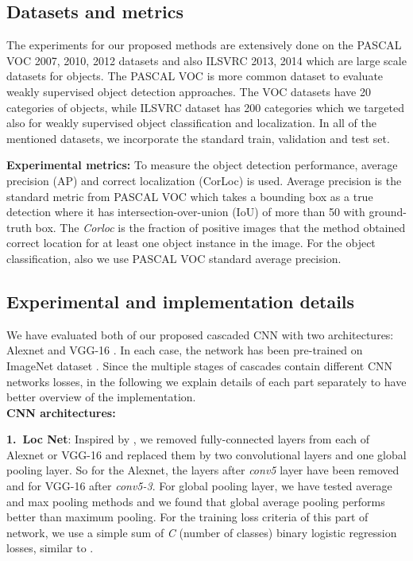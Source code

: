 \documentclass[10pt,twocolumn,letterpaper]{article}
\begin{document}
\subsection{Datasets and metrics}
The experiments for our proposed methods are extensively done on the PASCAL VOC 2007, 2010, 2012 datasets and also ILSVRC 2013, 2014 which are large scale datasets for objects. The PASCAL VOC is more common dataset to evaluate weakly supervised object detection approaches. The VOC datasets have 20 categories of objects, while ILSVRC dataset has 200 categories which we targeted also for weakly supervised object classification and localization. In all of the mentioned datasets, we incorporate the standard train, validation and test set.

\textbf{Experimental metrics:} To measure the object detection performance, average precision (AP) and correct localization (CorLoc) is used. Average precision is the standard metric from PASCAL VOC which takes a bounding box as a true detection where it has intersection-over-union (IoU) of more than 50 with ground-truth box. The \textit{Corloc} is the fraction of positive images that the method obtained correct location for at least one object instance in the image. For the object classification, also we use PASCAL VOC standard average precision.

\subsection{Experimental and implementation details }
We have evaluated both of our proposed cascaded CNN with two architectures: Alexnet \cite{alexnet} and VGG-16 \cite{vgg}. In each case, the network has been pre-trained on ImageNet dataset \cite{imagenet}. Since the multiple stages of cascades contain different CNN networks losses, in the following we explain details of each part separately to have better overview of the implementation.
\\
\textbf{CNN architectures:}

\textbf{1.~Loc Net}: Inspired by \cite{gap_paper}, we removed fully-connected layers from each of Alexnet or VGG-16 and replaced them by two convolutional layers and one global pooling layer. So for the Alexnet, the layers after \textit{conv5} layer have been removed and for VGG-16 after \textit{conv5-3}. For global pooling layer, we have tested average and max pooling methods and we found that global average pooling performs better than maximum pooling. For the training loss criteria of this part of network, we use a simple sum of \textit{C} (number of classes) binary logistic regression losses, similar to \cite{laptev15}.
\end{document}
